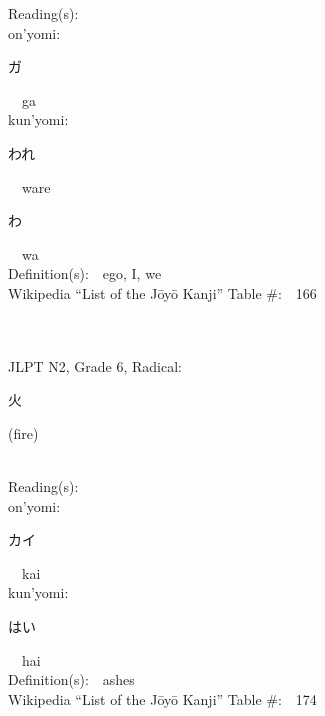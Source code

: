 \begin{multicols}{2}
Reading(s):\ \ \\
{\hspace*{1em}}on'yomi:\ \ \\
{\hspace*{2em}}{\begin{CJK}{UTF8}{min} ガ \end{CJK}}\ \ ga\ \ \\
{\hspace*{1em}}kun'yomi:\ \ \\
{\hspace*{2em}}{\begin{CJK}{UTF8}{min} われ \end{CJK}}\ \ ware\ \ \\
{\hspace*{2em}}{\begin{CJK}{UTF8}{min} わ \end{CJK}}\ \ wa\ \ \\
Definition(s):\ \ ego, I, we \\
Wikipedia ``List of the J\=oy\=o Kanji'' Table \#:\ \ 166 \\
\ \ \\
{\fontsize{34pt}{40pt}  }\ \ \\  %
{JLPT N2, Grade 6, Radical:\ \ {\begin{CJK}{UTF8}{min} 火 \end{CJK}} (fire) } \\
Reading(s):\ \ \\
{\hspace*{1em}}on'yomi:\ \ \\
{\hspace*{2em}}{\begin{CJK}{UTF8}{min} カイ \end{CJK}}\ \ kai\ \ \\
{\hspace*{1em}}kun'yomi:\ \ \\
{\hspace*{2em}}{\begin{CJK}{UTF8}{min} はい \end{CJK}}\ \ hai\ \ \\
Definition(s):\ \ ashes \\
Wikipedia ``List of the J\=oy\=o Kanji'' Table \#:\ \ 174 \\
\ \ \\

\end{multicols}
